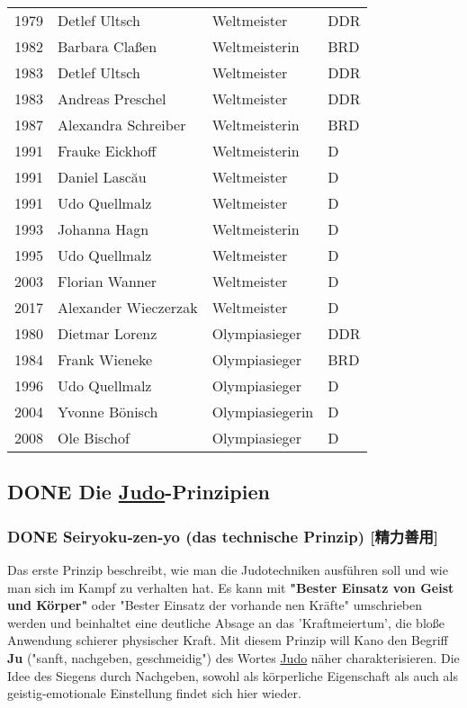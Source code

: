\documentclass[11pt]{article}
\begin{document}
\begin{center}
\begin{tabular}{rlll}
\hline
1979 & Detlef Ultsch & Weltmeister & DDR\\
1982 & Barbara Claßen & Weltmeisterin & BRD\\
1983 & Detlef Ultsch & Weltmeister & DDR\\
1983 & Andreas Preschel & Weltmeister & DDR\\
1987 & Alexandra Schreiber & Weltmeisterin & BRD\\
1991 & Frauke Eickhoff & Weltmeisterin & D\\
1991 & Daniel Lascău & Weltmeister & D\\
1991 & Udo Quellmalz & Weltmeister & D\\
1993 & Johanna Hagn & Weltmeisterin & D\\
1995 & Udo Quellmalz & Weltmeister & D\\
2003 & Florian Wanner & Weltmeister & D\\
2017 & Alexander Wieczerzak & Weltmeister & D\\
\hline
1980 & Dietmar Lorenz & Olympiasieger & DDR\\
1984 & Frank Wieneke & Olympiasieger & BRD\\
1996 & Udo Quellmalz & Olympiasieger & D\\
2004 & Yvonne Bönisch & Olympiasiegerin & D\\
2008 & Ole Bischof & Olympiasieger & D\\
\hline
\end{tabular}
\end{center}

\subsection{{\bfseries\sffamily DONE} Die \hyperref[org5f8b831]{Judo}-Prinzipien}
\label{sec:org6906367}
\subsubsection{{\bfseries\sffamily DONE} Seiryoku‐zen‐yo (das technische Prinzip) [精力善用]}
\label{sec:org41f7dd3}
Das erste Prinzip beschreibt, wie man die Judotechniken ausführen soll und wie man sich im Kampf zu verhalten hat. Es kann mit \textbf{"Bester Einsatz von Geist und Körper"} oder "Bester Einsatz der vorhande
nen Kräfte" umschrieben werden und beinhaltet eine deutliche Absage an das 'Kraftmeiertum', die bloße Anwendung schierer physischer Kraft. Mit diesem Prinzip will Kano den Begriff \textbf{Ju} ("sanft, nachgeben, geschmeidig") des Wortes \hyperref[org5f8b831]{Judo} näher charakterisieren. Die Idee des Siegens durch Nachgeben, sowohl als körperliche Eigenschaft als auch als geistig-emotionale Einstellung findet sich hier wieder. 
\end{document}
